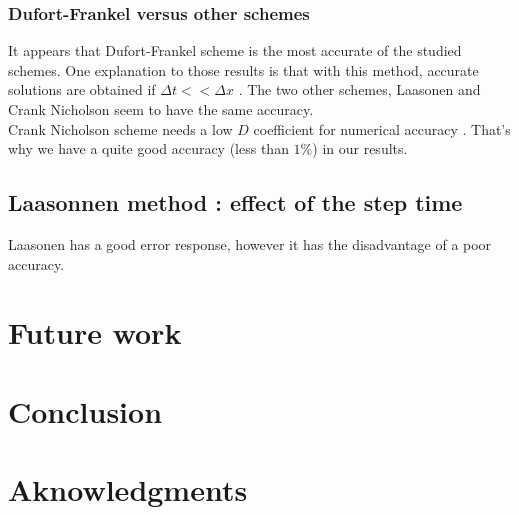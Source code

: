 \documentclass{article}
\begin{document}
            \subsubsection{Dufort-Frankel versus other schemes}
                It appears that Dufort-Frankel scheme is the most accurate of the studied schemes. One explanation to those
                results is that with this method, accurate solutions are obtained if $\Delta t << \Delta x$ \cite{df}.
                The two other schemes, Laasonen and Crank Nicholson seem to have the same accuracy.
                \\
                Crank Nicholson scheme needs a low $D$ coefficient for numerical accuracy \cite{crank}. That's why 
                we have a quite good accuracy (less than $1\%$) in our results.

            
        \subsection{Laasonnen method : effect of the step time}
                Laasonen has a good error response, however it has the disadvantage of a poor accuracy.\cite{laas}
    \newpage
    \section{Future work}

    \newpage
    \section{Conclusion}

    \newpage
    \section{Aknowledgments}

    \newpage
\end{document}
